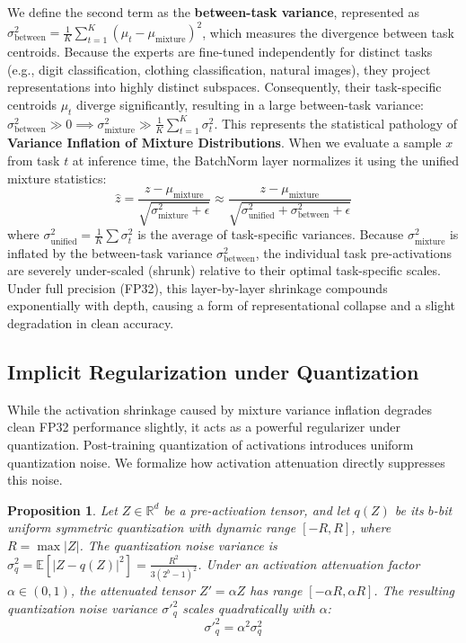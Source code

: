 \documentclass{article}
\theoremstyle{plain}
\newtheorem{proposition}[theorem]{Proposition}
\theoremstyle{definition}
\theoremstyle{remark}
\begin{document}
We define the second term as the \textbf{between-task variance},
represented as $\sigma^2_{\text{between}} = \frac{1}{K} \sum_{t=1}^K (\mu_t - \mu_{\text{mixture}})^2$,
which measures the divergence between task centroids.
Because the experts are fine-tuned independently for distinct tasks
(e.g., digit classification, clothing classification, natural images), they
project representations into highly distinct subspaces.
Consequently, their task-specific centroids $\mu_t$ diverge significantly,
resulting in a large between-task variance:
$\sigma^2_{\text{between}} \gg 0 \implies \sigma^2_{\text{mixture}} \gg \frac{1}{K} \sum_{t=1}^K \sigma^2_t$.
This represents the statistical pathology of \textbf{Variance Inflation of Mixture Distributions}.
When we evaluate a sample $x$ from task $t$ at inference time,
the BatchNorm layer normalizes it using the unified mixture statistics:
\begin{equation}
    \hat{z} = \frac{z - \mu_{\text{mixture}}}{\sqrt{\sigma^2_{\text{mixture}} + \epsilon}} \approx \frac{z - \mu_{\text{mixture}}}{\sqrt{\sigma^2_{\text{unified}} + \sigma^2_{\text{between}} + \epsilon}}
\end{equation}
where $\sigma^2_{\text{unified}} = \frac{1}{K} \sum \sigma^2_t$ is the average of task-specific variances. Because $\sigma^2_{\text{mixture}}$ is inflated by the between-task variance $\sigma^2_{\text{between}}$, the individual task pre-activations are severely under-scaled (shrunk) relative to their optimal task-specific scales. Under full precision (FP32), this layer-by-layer shrinkage compounds exponentially with depth, causing a form of representational collapse and a slight degradation in clean accuracy.

\subsection{Implicit Regularization under Quantization}
While the activation shrinkage caused by mixture variance inflation degrades clean FP32 performance slightly, it acts as a powerful regularizer under quantization. Post-training quantization of activations introduces uniform quantization noise. We formalize how activation attenuation directly suppresses this noise.

\begin{proposition} \label{prop:noise_suppression}
Let $Z \in \mathbb{R}^d$ be a pre-activation tensor, and let $q(Z)$ be its $b$-bit uniform symmetric quantization with dynamic range $[-R, R]$, where $R = \max |Z|$. The quantization noise variance is $\sigma^2_q = \mathbb{E}[|Z - q(Z)|^2] = \frac{R^2}{3(2^b - 1)^2}$. Under an activation attenuation factor $\alpha \in (0, 1)$, the attenuated tensor $Z' = \alpha Z$ has range $[-\alpha R, \alpha R]$. The resulting quantization noise variance $\sigma'^2_q$ scales quadratically with $\alpha$:
\begin{equation}
    \sigma'^2_q = \alpha^2 \sigma^2_q
\end{equation}
\end{proposition}
\end{document}
